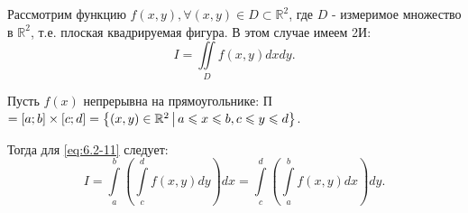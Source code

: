 Рассмотрим функцию $f(x,y), \forall (x,y) \in D \subset \mathbb{R}^2$, где $D$ - измеримое множество в $\mathbb{R}^2$, т.е. плоская квадрируемая фигура. В этом случае имеем 2И:
\begin{equation}
	\label{eq:6.2-11}
	I = \iint\limits_{D} f(x,y)dxdy.
\end{equation}
\begin{theorem}
	Пусть $f(x)$ непрерывна на прямоугольнике: П $= [a;b]\times[c;d] = \left\{ (x,y) \in \mathbb{R}^2  \, \middle\vert \, a \leqslant x \leqslant b, c \leqslant y \leqslant d \right\}$.

	Тогда для \eqref{eq:6.2-11} следует:
	\begin{equation}
		\label{eq:6.2-12}
		I = \int\limits_{a}^b \left(\int\limits_{c}^d f(x,y)dy\right)dx =  \int\limits_{c}^d \left(\int\limits_{a}^b f(x,y)dx\right)dy.
	\end{equation}
\end{theorem}
